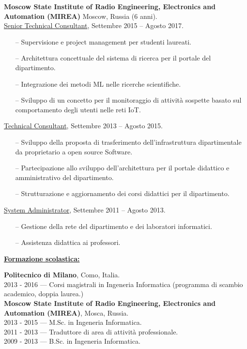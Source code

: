 \documentclass[a4paper,10pt,fullpage]{article}
\begin{document}
\textbf{Moscow State Institute of Radio Engineering, Electronics and Automation (MIREA)} Moscow, Russia (6 anni).\\
\underline{Senior Technical Consultant}, Settembre 2015 – Agosto 2017.
\begin{itemize}
	\item[--] Supervisione e project management per studenti laureati.
	\item[--] Architettura concettuale del sistema di ricerca per il portale del dipartimento.
	\item[--] Integrazione dei metodi ML nelle ricerche scientifiche.
	\item[--] Sviluppo di un concetto per il monitoraggio di attività sospette basato sul comportamento degli utenti nelle reti IoT.
\end{itemize}
\underline{Technical Consultant}, Settembre 2013 – Agosto 2015.
\begin{itemize}
	\item[--] Sviluppo della proposta di trasferimento dell'infrastruttura dipartimentale da proprietario a open source
	Software.
	\item[--] Partecipazione allo sviluppo dell'architettura per il portale didattico e amministrativo del dipartimento.
	\item[--] Strutturazione e aggiornamento dei corsi didattici per il dipartimento.
\end{itemize}
\underline{System Administrator}, Settembre 2011 – Agosto 2013.
\begin{itemize}
	\item[--] Gestione della rete del dipartimento e dei laboratori informatici.
	\item[--] Assistenza didattica ai professori.
\end{itemize}

\begin{center}
	\underline{\textbf{\large Formazione scolastica:}}
\end{center}	
\textbf{Politecnico di Milano}, Como, Italia.\\
2013 - 2016 --- Corsi magistrali in Ingeneria Informatica (programma di scambio academico, doppia laurea.)\\

\textbf{Moscow State Institute of Radio Engineering, Electronics and Automation (MIREA)}, Mosca,
Russia.\\
2013 - 2015 --- M.Sc. in Ingeneria Informatica.\\
2011 - 2013 --- Traduttore di area di attività professionale. \\
2009 - 2013 --- B.Sc. in Ingeneria Informatica.
\end{document}

